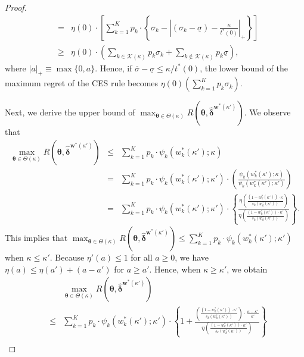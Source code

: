 \documentclass[12pt,a4paper]{article}
\begin{document}
\begin{proof}
\begin{eqnarray}
&=& \eta(0) \cdot \left[ \sum_{k=1}^K p_k \cdot \left\{ \sigma_k - \left| (\sigma_k - \underline{\sigma}) - \frac{\kappa}{t^{\ast}(0)} \right|_{+} \right\}  \right] \nonumber \\
& \geq & \eta(0) \cdot \left( \sum_{k \in \mathcal{K}(\kappa)} p_k \sigma_k + \sum_{k \not\in \mathcal{K}(\kappa)} p_k  \underline{\sigma}  \right), \label{CES_lower}
\end{eqnarray}
where $|a|_{+} \equiv \max\{0,a\}$. Hence, if $\overline{\sigma} - \underline{\sigma} \leq \kappa / t^{\ast}(0)$, the lower bound of the maximum regret of the CES rule becomes $\eta(0) \left( \sum_{k=1}^K p_k \sigma_k \right)$.

Next, we derive the upper bound of $\max_{\bm{\theta} \in \Theta(\kappa)} R(\bm{\theta},\hat{\bm{\delta}}^{\bm{w}^*(\kappa')})$. We observe that
\begin{eqnarray*}
\max_{\bm{\theta} \in \Theta(\kappa)} R(\bm{\theta},\hat{\bm{\delta}}^{\bm{w}^*(\kappa')}) &\leq & \sum_{k=1}^K p_k \cdot \psi_k\left( w_k^{\ast}(\kappa') ;\kappa \right)  \\
&=& \sum_{k=1}^K p_k \cdot \psi_k\left( w_k^{\ast}(\kappa') ;\kappa' \right) \cdot \left( \frac{\psi_k\left( w_k^{\ast}(\kappa') ;\kappa \right)}{\psi_k\left( w_k^{\ast}(\kappa') ;\kappa' \right)} \right) \\
&=& \sum_{k=1}^K p_k \cdot \psi_k\left( w_k^{\ast}(\kappa') ;\kappa' \right) \cdot \left\{ \frac{\eta \left( \frac{(1-w_k^{\ast}(\kappa')) \cdot \kappa}{s_k \left( w_k^{\ast}(\kappa') \right)} \right)}{\eta \left( \frac{(1-w_k^{\ast}(\kappa')) \cdot \kappa'}{s_k \left( w_k^{\ast}(\kappa') \right)} \right)} \right\}.
\end{eqnarray*}
This implies that $\max_{\bm{\theta} \in \Theta(\kappa)} R(\bm{\theta},\hat{\bm{\delta}}^{\bm{w}^*(\kappa')}) \leq \sum_{k=1}^K p_k \cdot \psi_k\left( w_k^{\ast}(\kappa') ;\kappa' \right)$ when $\kappa \leq \kappa'$. Because $\eta'(a) \leq 1$ for all $a \geq 0$, we have $\eta(a) \leq \eta(a') + (a-a')$ for $a \geq a'$. Hence, when $\kappa \geq \kappa'$, we obtain
\begin{eqnarray}
& & \max_{\bm{\theta} \in \Theta(\kappa)} R(\bm{\theta},\hat{\bm{\delta}}^{\bm{w}^*(\kappa')}) \nonumber \\
&\leq & \sum_{k=1}^K p_k \cdot \psi_k\left( w_k^{\ast}(\kappa') ;\kappa' \right) \cdot \left\{ 1 + \frac{ \left( \frac{(1-w_k^{\ast}(\kappa'))\cdot \kappa' }{s_k \left( w_k^{\ast}(\kappa') \right)} \right) \cdot \frac{\kappa - \kappa'}{\kappa'}}{\eta \left( \frac{(1-w_k^{\ast}(\kappa')) \cdot \kappa'}{s_k \left( w_k^{\ast}(\kappa') \right)} \right)} \right\} \nonumber \\

\end{eqnarray}
\end{proof}
\end{document}
